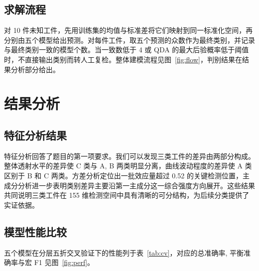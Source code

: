\documentclass[12pt,a4paper]{article}
\begin{document}
\subsection{求解流程}

对 10 件未知工件，先用训练集的均值与标准差将它们映射到同一标准化空间，再分别由五个模型给出预测。对每件工件，取五个预测的众数作为最终类别，并记录与最终类别一致的模型个数。当一致数低于 4 或 QDA 的最大后验概率低于阈值时，不直接输出类别而转人工复检。整体建模流程见图~\ref{fig:flow}，判别结果在结果分析部分给出。

\section{结果分析}
\subsection{特征分析结果}

特征分析回答了题目的第一项要求。我们可以发现三类工件的差异由两部分构成。整体透射水平的差异使 C 类与 A, B 两类明显分离，曲线波动程度的差异使 A 类区别于 B 和 C 两类。方差分析定位出一批效应量超过 0.52 的关键检测位置，主成分分析进一步表明类别差异主要沿第一主成分这一综合强度方向展开。这些结果共同说明三类工件在 155 维检测空间中具有清晰的可分结构，为后续分类提供了实证依据。

\subsection{模型性能比较}

五个模型在分层五折交叉验证下的性能列于表~\ref{tab:cv}，对应的总准确率, 平衡准确率与宏 F1 见图~\ref{fig:perf}。

\begin{table}[H]
\centering
\caption{五个统计判别模型的交叉验证性能}
\label{tab:cv}
\end{table}
\end{document}
